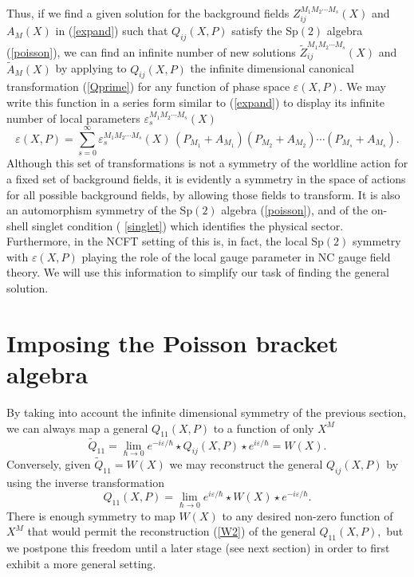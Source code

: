\documentclass[a4paper,12pt]{article}
\begin{document}
Thus, if we find a given solution for the background fields $%
Z_{ij}^{M_{1}M_{2}\cdots M_{s}}\left( X\right) $ and $A_{M}\left( X\right) $
in (\ref{expand}) such that $Q_{ij}\left( X,P\right) $ satisfy the Sp$\left(
2\right) $ algebra (\ref{poisson}), we can find an infinite number of new
solutions $\tilde{Z}_{ij}^{M_{1}M_{2}\cdots M_{s}}\left( X\right) $ and $%
\tilde{A}_{M}\left( X\right) $ by applying to $Q_{ij}\left( X,P\right) $ the
infinite dimensional canonical transformation (\ref{Qprime}) for any
function of phase space $\varepsilon \left( X,P\right) .$ We may write this
function in a series form similar to (\ref{expand}) to display its infinite
number of local parameters $\varepsilon _{s}^{M_{1}M_{2}\cdots M_{s}}(X)$
\begin{equation}
\varepsilon (X,P)=\sum_{s=0}^{\infty }\varepsilon _{s}^{M_{1}M_{2}\cdots
M_{s}}\left( X\right) \,(P_{M_{1}}+A_{M_{1}})(P_{M_{2}}+A_{M_{2}})\cdots
(P_{M_{s}}+A_{M_{s}}).  \label{epsilon}
\end{equation}
Although this set of transformations is not a symmetry of the worldline
action for a fixed set of background fields, it is evidently a symmetry in
the space of actions for all possible background fields, by allowing those
fields to transform. It is also an automorphism symmetry of the Sp$\left(
2\right) $ algebra (\ref{poisson}), and of the on-shell singlet condition (%
\ref{singlet}) which identifies the physical sector. Furthermore, in the
NCFT setting of \cite{ncsp} this is, in fact, the local Sp$\left( 2\right) $
symmetry with $\varepsilon (X,P)$ playing the role of the local gauge
parameter in NC gauge field theory. We will use this information to simplify
our task of finding the general solution.

\section{Imposing the Poisson bracket algebra}

By taking into account the infinite dimensional symmetry of the previous
section, we can always map a general $Q_{11}\left( X,P\right) $ to a
function of only $X^{M}$%
\begin{equation}
\tilde{Q}_{11}=\lim_{\hbar \rightarrow 0}e^{-i\varepsilon /\hbar }\star
Q_{ij}\left( X,P\right) \star e^{i\varepsilon /\hbar }=W\left( X\right) .
\label{W1}
\end{equation}
Conversely, given $\tilde{Q}_{11}=W\left( X\right) $ we may reconstruct the
general $Q_{ij}\left( X,P\right) $ by using the inverse transformation
\begin{equation}
Q_{11}\left( X,P\right) =\lim_{\hbar \rightarrow 0}e^{i\varepsilon /\hbar
}\star W\left( X\right) \star e^{-i\varepsilon /\hbar }.  \label{W2}
\end{equation}
There is enough symmetry to map $W\left( X\right) $ to any desired non-zero
function of $X^{M}$ that would permit the reconstruction (\ref{W2}) of the
general $Q_{11}\left( X,P\right) ,$ but we postpone this freedom until a
later stage (see next section) in order to first exhibit a more general
setting.
\end{document}
